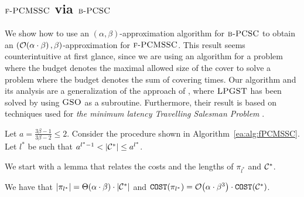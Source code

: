 \subsection{$\textup{\textsc{f-PCMSSC}}$ via $\textup{\textsc{b-PCSC}}$} \label{ea:subsection:PCMSSC}
We show how to use an $(\alpha,\beta)$-approximation algorithm for $\textup{\textsc{b-PCSC}}$ to obtain an $\mathopen{}\left( \mathcal{O}\mathopen{}\left( \alpha\cdot\beta \right), \beta \right)$-approximation for $\textup{\textsc{f-PCMSSC}}$. This result seems counterintuitive at first glance, since we are using an algorithm for a problem where the budget denotes the maximal allowed size of the cover to solve a problem where the budget denotes the sum of covering times. Our algorithm and its analysis are a generalization of the approach of \cite{ApproxAlgsForOptDTsAndAdapTSPProblems}, where $\textup{\textsc{LPGST}}$ has been solved by using $\textup{\textsc{GSO}}$ as a subroutine. Furthermore, their result is based on techniques used for \textit{the minimum latency Travelling Salesman Problem} \cite{PathsTreesMinimumLatencyTours,KTravelingRepairmenProblem}.

Let $a=\frac{3\beta-1}{3\beta-2}\leq 2$.
Consider the procedure shown in Algorithm~\ref{ea:alg:fPCMSSC}.
Let $l^*$ be such that $a^{l^*-1} < \mathopen{}\left| \mathcal{C}^{*} \right| \leq a^{l^*}$.

We start with a lemma that relates the costs and the lengths of $\pi_{l^*}$ and $\mathcal{C}^{*}$.
    \begin{lemma}\label{ea:lem:pi-spread-cost}
        We have that $\mathopen{}\left| \pi_{l^*} \right| = \Theta\mathopen{}\left( \alpha \cdot \beta \right)\cdot \mathopen{}\left| \mathcal{C}^{*} \right|$ and $\texttt{COST}\mathopen{}\left( \pi_{l^*} \right) = \mathcal{O}\mathopen{}\left( \alpha\cdot\beta^3 \right)\cdot \texttt{COST}\mathopen{}\left( \mathcal{C}^{*} \right)$.
    \end{lemma}

